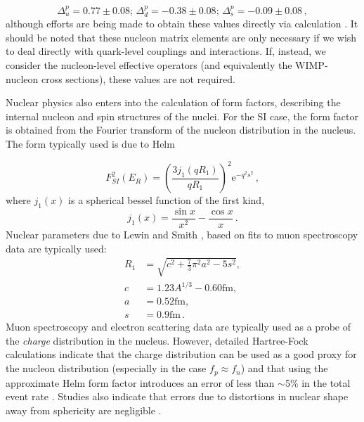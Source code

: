 \begin{equation}
\Delta_u^p = 0.77 \pm 0.08 ;\, \Delta_d^p = -0.38 \pm 0.08 ;\, \Delta_s^p = -0.09 \pm 0.08\,,
\end{equation}
although efforts are being made to obtain these values directly via calculation \cite{Qing:1998,Thomas:2008}. It should be noted that these nucleon matrix elements are only necessary if we wish to deal directly with quark-level couplings and interactions. If, instead, we consider the nucleon-level effective operators (and equivalently the WIMP-nucleon cross sections), these values are not required. %

Nuclear physics also enters into the calculation of form factors, describing the internal nucleon and spin structures of the nuclei. For the SI case, the form factor is obtained from the Fourier transform of the nucleon distribution in the nucleus. The form typically used is due to Helm \cite{Helm:1956}

\begin{equation}
F_{SI}^2(E_R) = \left(\frac{3j_1(qR_1)}{qR_1}\right)^2 \mathrm{e}^{-q^2s^2}\,,
\end{equation}
where $j_1(x)$ is a spherical bessel function of the first kind,
\begin{equation}
j_1(x) = \frac{\sin x}{x^2} - \frac{\cos x}{x}\,.
\end{equation}
Nuclear parameters due to Lewin and Smith \cite{Lewin:1996}, based on fits to muon spectroscopy data \cite{Fricke:1995} are typically used:
\begin{align}
R_1 & = \sqrt{c^2 + \frac{7}{3}\pi^2a^2 - 5s^2}, \\
c & = 1.23A^{1/3} - 0.60 \mathrm{ fm}, \\
a & = 0.52 \mathrm{ fm}, \\
s & = 0.9 \mathrm{ fm} \,.
\end{align}
Muon spectroscopy and electron scattering data \cite{Duda:2007} are typically used as a probe of the \textit{charge} distribution in the nucleus. However, detailed Hartree-Fock calculations indicate that the charge distribution can be used as a good proxy for the nucleon distribution (especially in the case $f_p \approx f_n$) and that using the approximate Helm form factor introduces an error of less than $\sim$5\% in the total event rate \cite{Co:2012}. Studies also indicate that errors due to distortions in nuclear shape away from sphericity are negligible \cite{Ya-Zheng:2012}.


